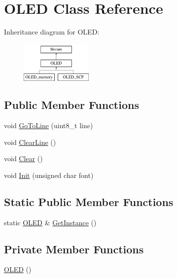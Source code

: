 \hypertarget{class_o_l_e_d}{}\section{O\+L\+ED Class Reference}
\label{class_o_l_e_d}
Inheritance diagram for O\+L\+ED\+:\begin{figure}[H]
\begin{center}
\leavevmode
\includegraphics[height=2.000000cm]{class_o_l_e_d}
\end{center}
\end{figure}
\subsection*{Public Member Functions}
\begin{DoxyCompactItemize}
\item 
void \hyperlink{class_o_l_e_d_a8d314130676b104ed959b92ab4bac25e}{Go\+To\+Line} (uint8\+\_\+t line)
\item 
void \hyperlink{class_o_l_e_d_a3a571f5ea7a183fa14932cd5b2c423eb}{Clear\+Line} ()
\item 
void \hyperlink{class_o_l_e_d_a6c7bb1fc91b3e574a275f90643da140a}{Clear} ()
\item 
void \hyperlink{class_o_l_e_d_a65c17f32b27117aa5ba03cdce01fbe11}{Init} (unsigned char font)
\end{DoxyCompactItemize}
\subsection*{Static Public Member Functions}
\begin{DoxyCompactItemize}
\item 
static \hyperlink{class_o_l_e_d}{O\+L\+ED} \& \hyperlink{class_o_l_e_d_a7b261492679b5e67d346e97ed575332e}{Get\+Instance} ()
\end{DoxyCompactItemize}
\subsection*{Private Member Functions}
\begin{DoxyCompactItemize}
\item 
\hyperlink{class_o_l_e_d_a8eabf371b5642d99800adb759dab27fd}{O\+L\+ED} ()
\end{DoxyCompactItemize}
